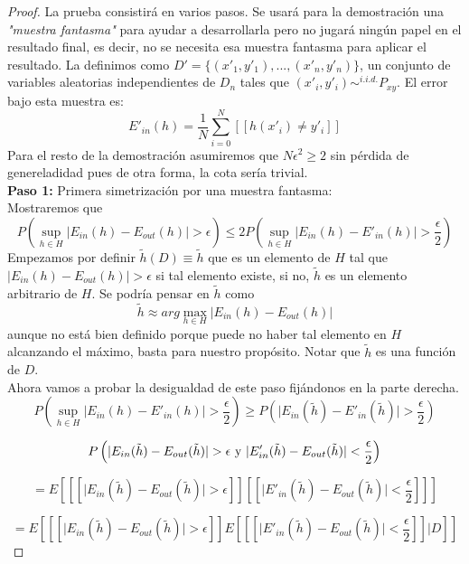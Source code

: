 \begin{proof}
La prueba consistirá en varios pasos. Se usará para la demostración una \textit{"muestra fantasma"} para ayudar a desarrollarla pero no jugará ningún papel en el resultado final, es decir, no se necesita esa muestra fantasma para aplicar el resultado. La definimos como $D'=\lbrace(x'_{1},y'_{1}),...,(x'_{n},y'_{n})\rbrace$, un conjunto de variables aleatorias independientes de $D_{n}$ tales que $(x'_{i},y'_{i})\sim^{i.i.d.} P_{xy}$. El error bajo esta muestra es:
\[ E'_{in}(h)=\frac{1}{N}\sum_{i=0}^{N}[[h(x'_{i}) \neq y'_{i}]] \] 
Para el resto de la demostración asumiremos que $N\epsilon^{2} \geq 2$ sin pérdida de genereladidad pues de otra forma, la cota sería trivial.\\
\textbf{Paso 1:} Primera simetrización por una muestra fantasma:\\
Mostraremos que 
\[ P \left( \sup_{h \in H} \vert E_{in}(h)-E_{out}(h) \vert >\epsilon \right) \leq 2P \left( \sup_{h \in H} \vert E_{in}(h)-E'_{in}(h) \vert >\frac{\epsilon}{2} \right) \]
Empezamos por definir $\tilde{h}(D) \equiv \tilde{h}$ que es un elemento de $H$ tal que $\vert E_{in}(h)-E_{out}(h) \vert > \epsilon$ si tal elemento existe, si no, $\tilde{h}$ es un elemento arbitrario de $H$. Se podría pensar en $\tilde{h}$ como 
\[ \tilde{h} \approx arg \max_{h \in H} \vert E_{in}(h)-E_{out}(h) \vert \]
aunque no está bien definido porque puede no haber tal elemento en $H$ alcanzando el máximo, basta para nuestro propósito. Notar que $\tilde{h}$ es una función de $D$.\\
Ahora vamos a probar la desigualdad de este paso fijándonos en la parte derecha.
\[ P \left( \sup_{h \in H} \vert E_{in}(h)-E'_{in}(h) \vert >\frac{\epsilon}{2} \right) \geq P \left( \vert E_{in}(\tilde{h})-E'_{in}(\tilde{h}) \vert >\frac{\epsilon}{2} \right) \]

\[ P \left( \vert E_{in}(\tilde{h})-E_{out}(\tilde{h}) \vert > \epsilon \textnormal{ y }\vert E'_{in}(\tilde{h})-E_{out}(\tilde{h}) \vert < \frac{\epsilon}{2} \right) \]

\[ = E \left[ [[\vert E_{in}(\tilde{h})-E_{out}(\tilde{h}) \vert > \epsilon ]] [[ \vert E'_{in}(\tilde{h})-E_{out}(\tilde{h}) \vert < \frac{\epsilon}{2} ]] \right] \]

\[ = E \left[ [[\vert E_{in}(\tilde{h})-E_{out}(\tilde{h}) \vert > \epsilon ]] E \left[ [[ \vert E'_{in}(\tilde{h})-E_{out}(\tilde{h}) \vert < \frac{\epsilon}{2} ]] \bigg\vert D \right] \right] \]


\end{proof}
